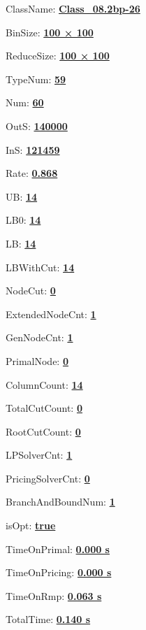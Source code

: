 \documentclass[11pt]{article}
\begin{document}
\pagestyle{empty}


ClassName: \underline{\textbf{Class_08.2bp-26}}
\par
BinSize: \underline{\textbf{100 × 100}}
\par
ReduceSize: \underline{\textbf{100 × 100}}
\par
TypeNum: \underline{\textbf{59}}
\par
Num: \underline{\textbf{60}}
\par
OutS: \underline{\textbf{140000}}
\par
InS: \underline{\textbf{121459}}
\par
Rate: \underline{\textbf{0.868}}
\par
UB: \underline{\textbf{14}}
\par
LB0: \underline{\textbf{14}}
\par
LB: \underline{\textbf{14}}
\par
LBWithCut: \underline{\textbf{14}}
\par
NodeCut: \underline{\textbf{0}}
\par
ExtendedNodeCnt: \underline{\textbf{1}}
\par
GenNodeCnt: \underline{\textbf{1}}
\par
PrimalNode: \underline{\textbf{0}}
\par
ColumnCount: \underline{\textbf{14}}
\par
TotalCutCount: \underline{\textbf{0}}
\par
RootCutCount: \underline{\textbf{0}}
\par
LPSolverCnt: \underline{\textbf{1}}
\par
PricingSolverCnt: \underline{\textbf{0}}
\par
BranchAndBoundNum: \underline{\textbf{1}}
\par
isOpt: \underline{\textbf{true}}
\par
TimeOnPrimal: \underline{\textbf{0.000 s}}
\par
TimeOnPricing: \underline{\textbf{0.000 s}}
\par
TimeOnRmp: \underline{\textbf{0.063 s}}
\par
TotalTime: \underline{\textbf{0.140 s}}
\par
\newpage


\end{document}
